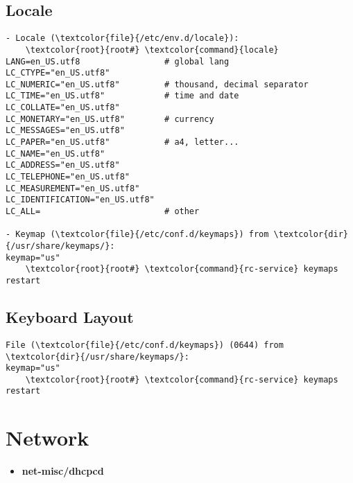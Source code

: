 \documentclass[10pt, a4paper, onecolumn, openany]{book}         %
\begin{document}
\section{Locale}
\begin{Verbatim}[commandchars=\\\{\}]
- Locale (\textcolor{file}{/etc/env.d/locale}):
    \textcolor{root}{root#} \textcolor{command}{locale}
LANG=en_US.utf8                 # global lang
LC_CTYPE="en_US.utf8"           
LC_NUMERIC="en_US.utf8"         # thousand, decimal separator
LC_TIME="en_US.utf8"            # time and date
LC_COLLATE="en_US.utf8"
LC_MONETARY="en_US.utf8"        # currency
LC_MESSAGES="en_US.utf8"
LC_PAPER="en_US.utf8"           # a4, letter...
LC_NAME="en_US.utf8"
LC_ADDRESS="en_US.utf8"
LC_TELEPHONE="en_US.utf8"
LC_MEASUREMENT="en_US.utf8"
LC_IDENTIFICATION="en_US.utf8"  
LC_ALL=                         # other

- Keymap (\textcolor{file}{/etc/conf.d/keymaps}) from \textcolor{dir}{/usr/share/keymaps/}:
keymap="us"
    \textcolor{root}{root#} \textcolor{command}{rc-service} keymaps restart
\end{Verbatim}

\section{Keyboard Layout}
\begin{Verbatim}[commandchars=\\\{\}]
File (\textcolor{file}{/etc/conf.d/keymaps}) (0644) from \textcolor{dir}{/usr/share/keymaps/}:
keymap="us"
    \textcolor{root}{root#} \textcolor{command}{rc-service} keymaps restart
\end{Verbatim}


\chapter{Network}%
\begin{itemize}
    \item \textbf{net-misc/dhcpcd}
\end{itemize}
\end{document}
